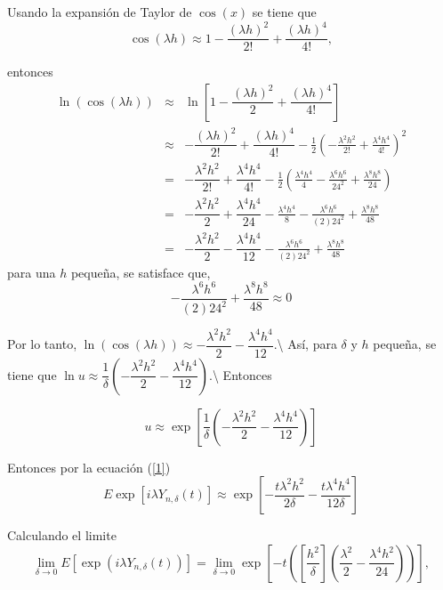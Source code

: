 \documentclass[
  letterpaper,
  DIV=11,
  numbers=noendperiod]{scrreprt}
\begin{document}
Usando la expansión de Taylor de \(\cos\left(x\right)\) se tiene que \[
\cos\left(\lambda h\right)\approx1-\dfrac{\left(\lambda h\right)^{2}}{2!}+\dfrac{\left(\lambda h\right)^{4}}{4!},
\]

entonces \begin{eqnarray}
    \ln\left(\cos\left(\lambda h\right)\right) & \approx & \ln\left[1-\dfrac{\left(\lambda h\right)^{2}}{2}+\dfrac{\left(\lambda h\right)^{4}}{4!}\right]\nonumber\\
 & \approx & -\dfrac{\left(\lambda h\right)^{2}}{2!}+\dfrac{\left(\lambda h\right)^{4}}{4!}-\frac{1}{2}\left(-\frac{\lambda^{2}h^{2}}{2!}+\frac{\lambda^{4}h^{4}}{4!}\right)^{2}\nonumber\\
  & = & -\dfrac{\lambda^{2} h^{2}}{2!}+\dfrac{\lambda ^{4}h^{4}}{4!}-\frac{1}{2}\left(\frac{\lambda^{4}h^{4}}{4}-\frac{\lambda^{6}h^{6}}{24^{2}}+\frac{\lambda^{8}h^{8}}{24}\right)\nonumber\\
   & = & -\dfrac{\lambda^{2} h^{2}}{2}+\dfrac{\lambda^{4} h^{4}}{24}-\frac{\lambda^{4}h^{4}}{8}-\frac{\lambda^{6}h^{6}}{(2)24^{2}}+\frac{\lambda^{8}h^{8}}{48}\nonumber\\
   & = & -\dfrac{\lambda^{2} h^{2}}{2}-\dfrac{\lambda^{4} h^{4}}{12}-\frac{\lambda^{6}h^{6}}{(2)24^{2}}+\frac{\lambda^{8}h^{8}}{48}
\end{eqnarray} para una \(h\) pequeña, se satisface que, \[
-\frac{\lambda^{6}h^{6}}{(2)24^{2}}+\frac{\lambda^{8}h^{8}}{48}\approx 0
\]

Por lo tanto,
\(\ln\left(\cos\left(\lambda h\right)\right)\approx -\dfrac{\lambda^{2} h^{2}}{2}-\dfrac{\lambda^{4} h^{4}}{12}\).\textbackslash{}
Así, para \(\delta\) y \(h\) pequeña, se tiene que
\(\ln u\approx \dfrac{1}{\delta}\left(-\dfrac{\lambda^{2} h^{2}}{2}-\dfrac{\lambda^{4} h^{4}}{12}\right)\).\textbackslash{}
Entonces

\begin{equation}
    u\approx\exp\left[\dfrac{1}{\delta}\left(-\dfrac{\lambda^{2} h^{2}}{2}-\dfrac{\lambda^{4} h^{4}}{12}\right)\right]
\end{equation}

Entonces por la ecuación (\ref{1}) \begin{equation}
    E\exp\left[i\lambda Y_{n,\delta}\left(t\right)\right]\approx\exp\left[-\dfrac{t\lambda^{2} h^{2}}{2\delta}-\dfrac{t\lambda^{4} h^{4}}{12\delta}\right]
\end{equation}

Calculando el limite \[
\lim_{\delta\to0}E\left[\exp\left(i\lambda Y_{n,\delta}\left(t\right)\right)\right]=\lim_{\delta\to0}\exp\left[-t\left(\left[\dfrac{h^{2}}{\delta}\right]\left(\dfrac{\lambda^{2}}{2}-\dfrac{\lambda^{4}h^{2}}{24}\right)\right)\right],
\]
\end{document}
